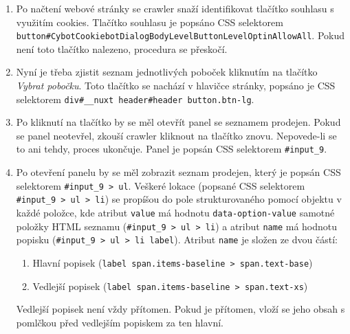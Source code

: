 \begin{enumerate}
    \item Po načtení webové stránky se crawler snaží identifikovat tlačítko
        souhlasu s využitím cookies. Tlačítko souhlasu je popsáno CSS
        selektorem\\
        \texttt{button\#CybotCookiebotDialogBodyLevelButtonLevelOptinAllowAll}.
        Pokud není toto tlačítko nalezeno, procedura se přeskočí.
    \item Nyní je třeba zjistit seznam jednotlivých poboček kliknutím
        na tlačítko \emph{Vybrat pobočku}. Toto tlačítko se nachází
        v hlavičce stránky, popsáno je CSS selektorem
        \texttt{div\#\_\_nuxt header\#header button.btn-lg}.
    \item Po kliknutí na tlačítko by se měl otevřít panel se seznamem
        prodejen. Pokud se panel neotevřel, zkouší crawler kliknout
        na tlačítko znovu. Nepovede-li se to ani tehdy, proces ukončuje.
        Panel je popsán CSS selektorem \texttt{\#input\_9}.
    \item Po otevření panelu by se měl zobrazit seznam prodejen, který
        je popsán CSS selektorem \texttt{\#input\_9 > ul}. Veškeré lokace
        (popsané CSS selektorem \texttt{\#input\_9 > ul > li}) se propíšou
        do pole strukturovaného pomocí objektu v každé položce, kde atribut
        \texttt{value} má hodnotu \texttt{data-option-value} samotné položky
        HTML seznamu (\texttt{\#input\_9 > ul > li}) a atribut \texttt{name}
        má hodnotu popisku (\texttt{\#input\_9 > ul > li label}). Atribut
        \texttt{name} je složen ze dvou částí:
        
        \begin{enumerate}
            \item Hlavní popisek
                (\texttt{label span.items-baseline > span.text-base})
            \item Vedlejší popisek
                (\texttt{label span.items-baseline > span.text-xs})
        \end{enumerate}
        
        Vedlejší popisek není vždy přítomen. Pokud je přítomen, vloží se
        jeho obsah s pomlčkou před vedlejším popiskem za ten hlavní.
        

\end{enumerate}
